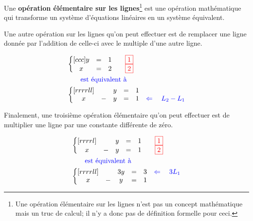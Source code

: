 \begin{NotDef}
Une \textbf{opération élémentaire sur les lignes}\footnote{Une opération élémentaire sur les lignes n'est pas un concept mathématique mais un truc de calcul; il n'y a
donc pas de définition formelle pour ceci.} est
une opération mathématique qui transforme un système
d'équations linéaires en un système équivalent.
\end{NotDef}

Une autre opération sur les lignes qu'on peut effectuer est
de remplacer une ligne donnée par l'addition de celle-ci avec le multiple 	d'une autre ligne.


\begin{align*}
&\left\{
\begin{matrix}[ccc]
    y&=& 1\qquad {\scriptstyle\color{red}\fbox{1}}\\
    x &=& 2\qquad {\scriptstyle\color{red}\fbox{2}}
\end{matrix}
\right.
\\
&\qquad\mbox{\color{blue} est équivalent à}\\
&\left\{
\begin{matrix}[rrrrll]
    &&y&=& 1	\\	
    x&-&y &=& 1 & {\color{blue}\Leftarrow\quad L_2 - L_1} 
\end{matrix}
\right.
\end{align*}
		

Finalement, une troisième opération élémentaire qu'on peut effectuer
est de multiplier une ligne par une constante différente
de zéro.

\begin{align*}
&\left\{
\begin{matrix}[rrrrl]
    &&y&=& 1	\qquad {\scriptstyle\color{red}\fbox{1}}\\	
    x&-&y &=& 1\qquad {\scriptstyle\color{red}\fbox{2}}
\end{matrix}
\right.
\\
&\qquad\mbox{\color{blue} est équivalent à}\\
&\left\{
\begin{matrix}[rrrrll]
    &&3y&=& 3	&{\color{blue}\Leftarrow\quad 3 L_1}\\	
    x&-&y &=& 1
\end{matrix}
\right.
\end{align*}


